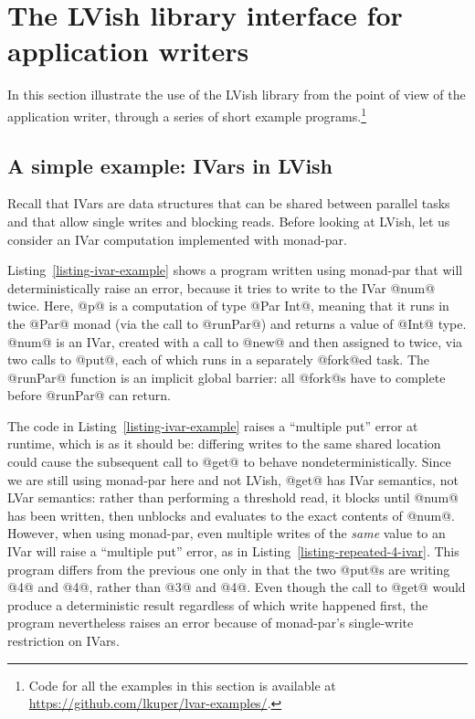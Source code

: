 \section{The LVish library interface for application writers}\label{s:lvish-api}

In this section  illustrate the use of the LVish library
from the point of view of the application writer, through a series of
short example programs.\footnote{Code for all the examples in this
  section is available at
  \url{https://github.com/lkuper/lvar-examples/}.}

\subsection{A simple example: IVars in LVish}

\ifdefined\DISSERTATION

Recall that IVars are data structures that can be shared between
parallel tasks and that allow single writes and blocking reads.
Before looking at LVish, let us consider an IVar computation
implemented with monad-par.

Listing~\ref{listing-ivar-example} shows a program written using
monad-par that will deterministically raise an error, because it tries
to write to the IVar @num@ twice.  Here, @p@ is a computation of type
@Par Int@, meaning that it runs in the @Par@ monad (via the call to
@runPar@) and returns a value of @Int@ type.  @num@ is an IVar,
created with a call to @new@ and then assigned to twice, via two calls
to @put@, each of which runs in a separately @fork@ed task.  The
@runPar@ function is an implicit global barrier: all @fork@s have to
complete before @runPar@ can return.

\singlespacing

\doublespacing

The code in Listing~\ref{listing-ivar-example} raises a ``multiple
put'' error at runtime, which is as it should be: differing writes to
the same shared location could cause the subsequent call to @get@ to
behave nondeterministically.  Since we are still using monad-par here
and not LVish, @get@ has IVar semantics, not LVar semantics: rather
than performing a threshold read, it blocks until @num@ has been
written, then unblocks and evaluates to the exact contents of @num@.
However, when using monad-par, even multiple writes of the \emph{same}
value to an IVar will raise a ``multiple put'' error, as in
Listing~\ref{listing-repeated-4-ivar}.  This program differs from the
previous one only in that the two @put@s are writing @4@ and @4@,
rather than @3@ and @4@.  Even though the call to @get@ would produce
a deterministic result regardless of which write happened first, the
program nevertheless raises an error because of monad-par's
single-write restriction on IVars.

